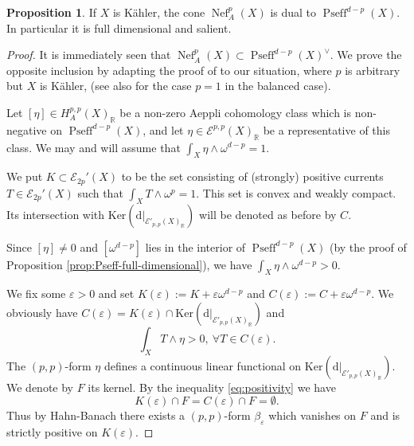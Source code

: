 \documentclass[a4,reqno]{amsart}
\theoremstyle{definition}
\newtheorem{proposition}[theorem]{Proposition}
\def\cE{\mathcal E}
\newcommand{\R}{\mathbb{R}}
\def\d{\mbox{d}}
\def\Ker{\mbox{Ker}}
\DeclareMathOperator{\Pseff}{Pseff}
\DeclareMathOperator{\Nef}{Nef}
\numberwithin{equation}{section}
\begin{document}
\begin{proposition}
    If $X$ is K\"ahler, the cone $\Nef_A^p(X)$ is dual to
    ${\Pseff}^{d-p}(X)$. In particular it is full dimensional and salient.
\end{proposition}

\begin{proof}  %
 

 
It is immediately seen that  
${\Nef}_{A}^p(X)\subset{\Pseff}^{d-p}(X)^\vee$.
We prove the opposite inclusion by adapting the proof of 
\cite[Lemme 1.3]{LamariJMPA} to our situation, where $p$ is arbitrary but $X$ is K\"ahler, (see also  \cite{ChioseRasdeaconuSuvaina2019} for the case $p=1$ in the balanced case). 


Let $[\eta]\in H^{p,p}_A(X)_{\R}$ 
be a non-zero Aeppli cohomology class which is non-negative on ${\Pseff}^{d-p}(X)$, 
and let $\eta\in \cE^{p,p}(X)_{\R}$ be a representative of this class. We may and will assume that $\int_{X}\eta\wedge\omega^{d-p}=1$.

We put $K\subset\cE_{2p}'(X)$ to be the set consisting of (strongly) positive currents $T\in \cE_{2p}'(X)$ such that $\int_X T\wedge\omega^p=1$. This set is convex and weakly compact. Its intersection with $\Ker(\d|_{ \cE'_{p,p}(X)_\R}) $ will be denoted as before by $C$.

Since $[\eta]\ne0$ and $[\omega^{d-p}]$ lies in the interior of  ${\Pseff}^{d-p}(X)$ (by the proof of Proposition \ref{prop:Pseff-full-dimensional}), we have $\int_{X}\eta\wedge\omega^{d-p}>0.$

We fix some $\varepsilon>0$ and  set 
$K(\varepsilon):=K+\varepsilon \omega^{d-p}$ and 
$C(\varepsilon):=C+\varepsilon \omega^{d-p}$. We obviously have 
$C(\varepsilon)=K(\varepsilon)\cap \Ker(\d|_{ \cE'_{p,p}(X)_\R}) $
and
\begin{equation}\label{eq:positivity}
\int_{X}T\wedge\eta>0,  \ \forall T\in C(\varepsilon).
\end{equation}
The $(p,p)$-form $\eta$ defines a  continuous linear functional on $\Ker(\d|_{ \cE'_{p,p}(X)_\R}) $. We denote by $F$ its kernel. By the inequality \eqref{eq:positivity} we have
$$K(\varepsilon)\cap F=C(\varepsilon)\cap F=\emptyset.$$
Thus by Hahn-Banach there exists a $(p,p)$-form 
$\beta_{\varepsilon}$ which vanishes on $F$ and is strictly positive 
on $K(\varepsilon)$. 


\end{proof}
\end{document}
